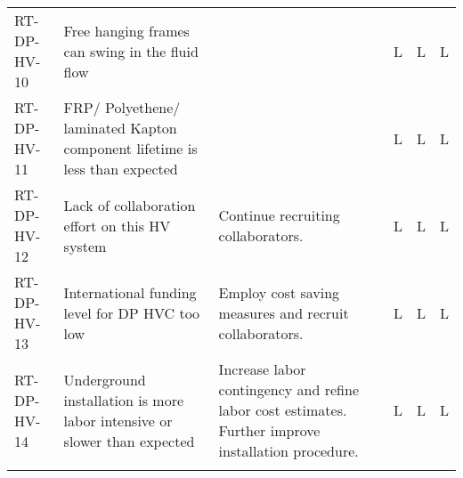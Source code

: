 \begin{footnotesize}
\begin{longtable}{P{0.18\textwidth}P{0.20\textwidth}P{0.32\textwidth}P{0.02\textwidth}P{0.02\textwidth}P{0.02\textwidth}}
RT-DP-HV-10 & Free hanging frames can swing in the fluid flow &  & L & L & L \\  \colhline
RT-DP-HV-11 & FRP/ Polyethene/ laminated Kapton component lifetime is less than expected &  & L & L & L \\  \colhline
RT-DP-HV-12 & Lack of collaboration effort on this HV system & Continue recruiting collaborators. & L & L & L \\  \colhline
RT-DP-HV-13 & International funding level for DP HVC too low & Employ cost saving measures and  recruit collaborators. & L & L & L \\  \colhline
RT-DP-HV-14 & Underground installation is more labor intensive or slower than expected & Increase labor contingency and refine labor cost estimates. Further improve installation procedure. & L & L & L \\  \colhline

\label{tab:risks:DP-FD-HV}
\end{longtable}
\end{footnotesize}
